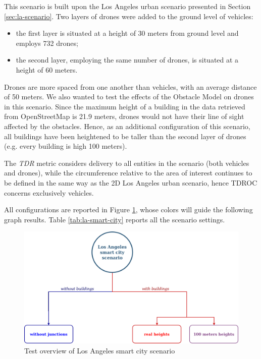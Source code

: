		
		This scenario is built upon the Los Angeles urban scenario presented in Section \ref{sec:la-scenario}. Two layers of drones were added to the ground level of vehicles: 
		\begin{itemize}
			\item the first layer is situated at a height of 30 meters from ground level and employs 732 drones;
			\item the second layer, employing the same number of drones, is situated at a height of 60 meters.
		\end{itemize}
		Drones are more spaced from one another than vehicles, with an average distance of 50 meters. We also wanted to test the effects of the Obstacle Model on drones in this scenario. Since the maximum height of a building in the data retrieved from OpenStreetMap is 21.9 meters, drones would not have their line of sight affected by the obstacles. Hence, as an additional configuration of this scenario, all buildings have been heightened to be taller than the second layer of drones (e.g. every building is high 100 meters).
		
		
		The \textit{TDR} metric considers delivery to all entities in the scenario (both vehicles and drones), while the circumference relative to the area of interest continues to be defined in the same way as the 2D Los Angeles urban scenario, hence TDROC concerns exclusively vehicles.
		
		
		All configurations are reported in Figure \ref{fig:la-smart-city-overview}, whose colors will guide the following graph results. Table \ref{tab:la-smart-city} reports all the scenario settings.
		
		\begin{figure}[H]
			\centering
			\includegraphics[width=1.0\textwidth]{immagini/la-smart-city/overview}
			\caption{Test overview of Los Angeles smart city scenario}
			\label{fig:la-smart-city-overview}
		\end{figure}
		
